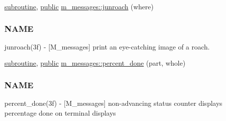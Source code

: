 \textbf{ }\par
\begin{DoxyCompactItemize}
\item 
\hyperlink{M__stopwatch_83_8txt_acfbcff50169d691ff02d4a123ed70482}{subroutine}, \hyperlink{M__stopwatch_83_8txt_a2f74811300c361e53b430611a7d1769f}{public} \hyperlink{namespacem__messages_a986ae6ab4c767cfedb3e8eb2894224db}{m\+\_\+messages\+::junroach} (where)
\begin{DoxyCompactList}\small\item\em \subsubsection*{N\+A\+ME}

junroach(3f) -\/ \mbox{[}M\+\_\+messages\mbox{]} print an eye-\/catching image of a roach. \end{DoxyCompactList}\item 
\hyperlink{M__stopwatch_83_8txt_acfbcff50169d691ff02d4a123ed70482}{subroutine}, \hyperlink{M__stopwatch_83_8txt_a2f74811300c361e53b430611a7d1769f}{public} \hyperlink{namespacem__messages_a94db4939f1beef711a49d603ba383943}{m\+\_\+messages\+::percent\+\_\+done} (part, whole)
\begin{DoxyCompactList}\small\item\em \subsubsection*{N\+A\+ME}

percent\+\_\+done(3f) -\/ \mbox{[}M\+\_\+messages\mbox{]} non-\/advancing status counter displays percentage done on terminal displays \end{DoxyCompactList}\end{DoxyCompactItemize}


